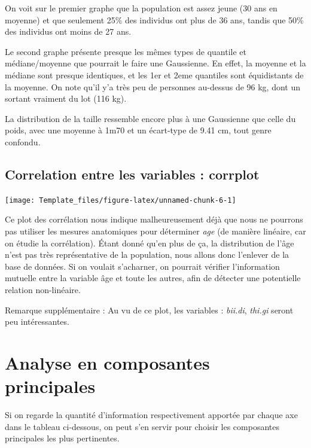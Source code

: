 \documentclass[
]{article}
\begin{document}
On voit sur le premier graphe que la population est assez jeune (30 ans
en moyenne) et que seulement 25\% des individus ont plus de 36 ans,
tandis que 50\% des individus ont moins de 27 ans.

Le second graphe présente presque les mêmes types de quantile et
médiane/moyenne que pourrait le faire une Gaussienne. En effet, la
moyenne et la médiane sont presque identiques, et les 1er et 2eme
quantiles sont équidistants de la moyenne. On note qu'il y'a très peu de
personnes au-dessus de 96 kg, dont un sortant vraiment du lot (116 kg).

La distribution de la taille ressemble encore plus à une Gaussienne que
celle du poids, avec une moyenne à 1m70 et un écart-type de 9.41 cm,
tout genre confondu.

\hypertarget{correlation-entre-les-variables-corrplot}{%
\subsection{Correlation entre les variables :
corrplot}\label{correlation-entre-les-variables-corrplot}}

\begin{center}\texttt{[image: Template\_files/figure-latex/unnamed-chunk-6-1]} \end{center}

Ce plot des corrélation nous indique malheureusement déjà que nous ne
pourrons pas utiliser les mesures anatomiques pour déterminer \emph{age}
(de manière linéaire, car on étudie la corrélation). Étant donné qu'en
plus de ça, la distribution de l'âge n'est pas très représentative de la
population, nous allons donc l'enlever de la base de données. Si on
voulait s'acharner, on pourrait vérifier l'information mutuelle entre la
variable âge et toute les autres, afin de détecter une potentielle
relation non-linéaire.

Remarque supplémentaire : Au vu de ce plot, les variables :
\emph{bii.di}, \emph{thi.gi} seront peu intéressantes.

\hypertarget{analyse-en-composantes-principales}{%
\section{Analyse en composantes
principales}\label{analyse-en-composantes-principales}}

Si on regarde la quantité d'information respectivement apportée par
chaque axe dans le tableau ci-dessous, on peut s'en servir pour choisir
les composantes principales les plus pertinentes.
\end{document}
